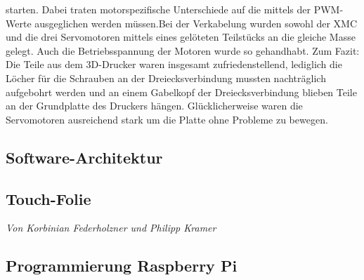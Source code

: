 \documentclass[12pt,a4paper,bibliography=totoc,listof=totoc]{scrartcl}
\begin{document}
starten. Dabei traten motorspezifische Unterschiede auf die mittels der PWM-Werte ausgeglichen werden 
müssen.Bei der Verkabelung wurden sowohl der XMC und die drei Servomotoren mittels eines gelöteten 
Teilstücks an die gleiche Masse gelegt. Auch die Betriebsspannung der Motoren wurde so gehandhabt.
Zum Fazit:
Die Teile aus dem 3D-Drucker waren insgesamt zufriedenstellend, lediglich die Löcher für die Schrauben 
an der Dreiecksverbindung mussten nachträglich aufgebohrt werden und an einem Gabelkopf der 
Dreiecksverbindung blieben Teile an der Grundplatte des Druckers hängen. Glücklicherweise waren die 
Servomotoren ausreichend stark um die Platte ohne Probleme zu bewegen.

\subsection{Software-Architektur}

\subsection{Touch-Folie}
\textit{Von Korbinian Federholzner und Philipp Kramer}\newline
\subsection{Programmierung Raspberry Pi}

\end{document}
